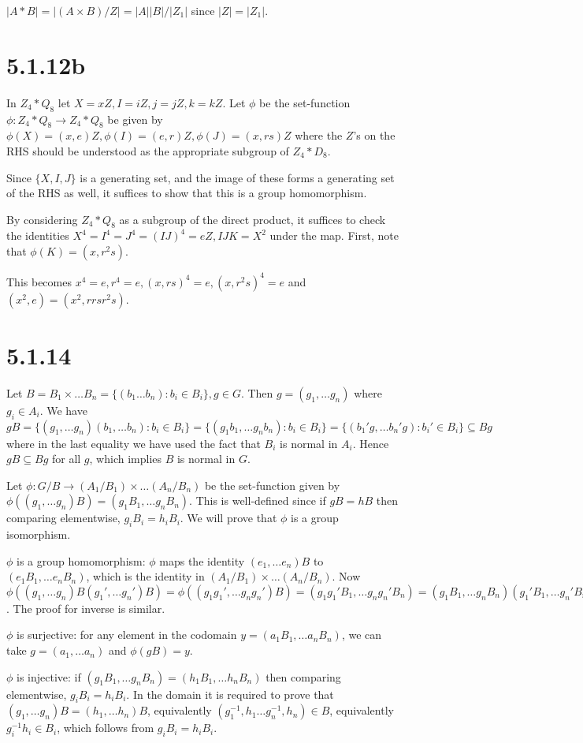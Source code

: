 \documentclass{article}
\def\inv{{-1}}
\begin{document}
$|A * B| = |(A \times B) / Z| = |A||B| / |Z_1|$ since $|Z| = |Z_1|$.

\section*{5.1.12b}

In $Z_4 * Q_8$ let $X = xZ, I = iZ, j = jZ, k = kZ$. Let $\phi$ be the set-function $\phi : Z_4 * Q_8 \to Z_4 * Q_8$ be given by $\phi(X) = (x, e)Z, \phi(I) = (e, r)Z, \phi(J) = (x, rs)Z$ where the $Z$'s on the RHS should be understood as the appropriate subgroup of $Z_4 * D_8$. 

Since $\{X, I, J\}$ is a generating set, and the image of these forms a generating set of the RHS as well, it suffices to show that this is a group homomorphism.

By considering $Z_4 * Q_8$ as a subgroup of the direct product, it suffices to check the identities $X^4 = I^4 = J^4 = (IJ)^4 = eZ, IJK = X^2$ under the map. First, note that $\phi(K) = (x, r^2s)$.

This becomes $x^4 = e, r^4 = e, (x, rs)^4 = e, (x, r^2s)^4 = e$ and $(x^2, e) = (x^2, rrsr^2s)$.
\section*{5.1.14}

Let $B = B_1 \times \ldots B_n = \{(b_1 \ldots b_n) : b_i \in B_i\}, g \in G$. Then $g = (g_1, \ldots g_n)$ where $g_i \in A_i$. We have $gB = \{(g_1, \ldots g_n)(b_1, \ldots b_n) : b_i \in B_i\} = \{(g_1b_1, \ldots g_nb_n) : b_i \in B_i\} = \{(b_1'g, \ldots b_n'g) : b_i' \in B_i\} \subseteq Bg$ where in the last equality we have used the fact that $B_i$ is normal in $A_i$. Hence $gB \subseteq Bg$ for all $g$, which implies $B$ is normal in $G$.

Let $\phi : G / B \to (A_1/B_1) \times \ldots (A_n/B_n)$ be the set-function given by $\phi((g_1, \ldots g_n)B) = (g_1B_1, \ldots g_nB_n)$. This is well-defined since if $gB = hB$ then comparing elementwise, $g_iB_i = h_iB_i$. We will prove that $\phi$ is a group isomorphism.

$\phi$ is a group homomorphism: $\phi$ maps the identity $(e_1, \ldots e_n)B$ to $(e_1B_1, \ldots e_nB_n)$, which is the identity in $(A_1/B_1) \times \ldots (A_n/B_n)$. Now $\phi((g_1, \ldots g_n)B(g_1', \ldots g_n')B) = \phi((g_1g_1', \ldots g_ng_n')B) = (g_1g_1'B_1, \ldots g_ng_n'B_n) = (g_1B_1, \ldots g_nB_n)(g_1'B_1, \ldots g_n'B_n) = \phi((g_1, \ldots g_n)B)\phi((g_1', \ldots g_n')B)$. The proof for inverse is similar.

$\phi$ is surjective: for any element in the codomain $y = (a_1B_1, \ldots a_nB_n)$, we can take $g = (a_1, \ldots a_n)$ and $\phi(gB) = y$.

$\phi$ is injective: if $(g_1B_1, \ldots g_nB_n) = (h_1B_1, \ldots h_nB_n)$ then comparing elementwise, $g_iB_i = h_iB_i$. In the domain it is required to prove that $(g_1, \ldots g_n)B = (h_1, \ldots h_n)B$, equivalently $(g_1^\inv, h_1 \ldots g_n^\inv, h_n) \in B$, equivalently $g_i^\inv h_i \in B_i$, which follows from $g_iB_i = h_iB_i$.
\end{document}
